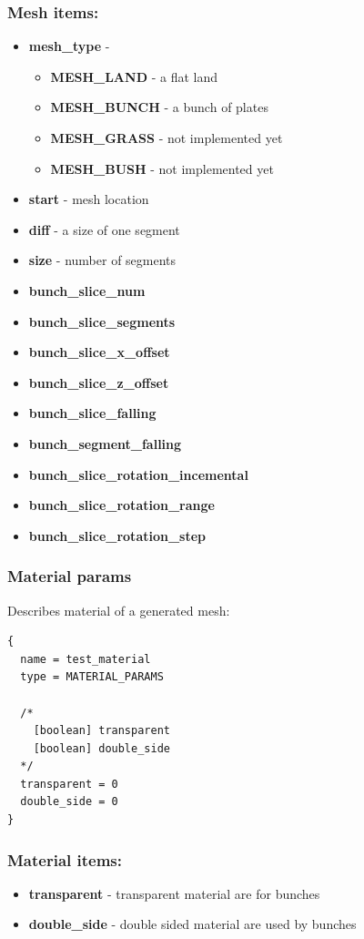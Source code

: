\documentclass[9pt]{article}
\begin{document}
\subsubsection*{Mesh items:}
\begin{itemize}
\item{\bf mesh\_type} - 
\begin{itemize}
\item{\bf MESH\_LAND} - a flat land
\item{\bf MESH\_BUNCH} - a bunch of plates
\item{\bf MESH\_GRASS} - not implemented yet
\item{\bf MESH\_BUSH} - not implemented yet
\end{itemize}
\item{\bf start} - mesh location
\item{\bf diff} - a size of one segment
\item{\bf size} - number of segments
\item{\bf bunch\_slice\_num}
\item{\bf bunch\_slice\_segments}
\item{\bf bunch\_slice\_x\_offset}
\item{\bf bunch\_slice\_z\_offset}
\item{\bf bunch\_slice\_falling}
\item{\bf bunch\_segment\_falling}
\item{\bf bunch\_slice\_rotation\_incemental}
\item{\bf bunch\_slice\_rotation\_range}
\item{\bf bunch\_slice\_rotation\_step}
\end{itemize}

\subsubsection{Material params}
Describes material of a generated mesh:
\begin{verbatim}
{
  name = test_material
  type = MATERIAL_PARAMS
  
  /*
    [boolean] transparent
    [boolean] double_side
  */
  transparent = 0
  double_side = 0  
}
\end{verbatim}
\subsubsection*{Material items:}
\begin{itemize}
\item{\bf transparent} - transparent material are for bunches
\item{\bf double\_side} - double sided material are used by bunches
\end{itemize}
\end{document}
